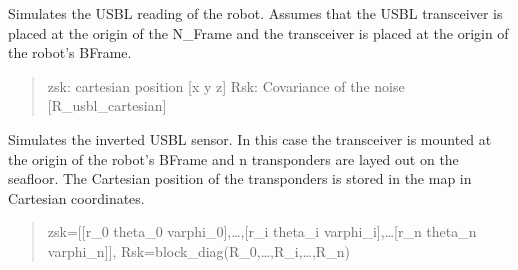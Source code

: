 \documentclass[letterpaper,10pt,english]{sphinxmanual}
\begin{document}
\begin{fulllineitems}
\begin{fulllineitems}
\begin{quote}
\begin{description}
\end{description}\end{quote}

\end{fulllineitems}


\begin{fulllineitems}
\label{\detokenize{robot_simulation:AUV4DOFSimulatedRobot.AUV4DOFSimulatedRobot.ReadUSBL}}
\pysigstartsignatures
{}
\pysigstopsignatures
\sphinxAtStartPar
Simulates the USBL reading of the robot. Assumes that the USBL transceiver is placed at the origin of the
N\_Frame and the transceiver is placed at the origin of the robot’s B\sphinxhyphen{}Frame.
\begin{quote}\begin{description}
\sphinxAtStartPar
zsk: cartesian position {[}x y z{]}
Rsk: Covariance of the noise {[}R\_usbl\_cartesian{]}

\end{description}\end{quote}

\end{fulllineitems}


\begin{fulllineitems}
\label{\detokenize{robot_simulation:AUV4DOFSimulatedRobot.AUV4DOFSimulatedRobot.ReadSpherical3DFeature}}
\pysigstartsignatures
{}
\pysigstopsignatures
\sphinxAtStartPar
Simulates the inverted USBL sensor. In this case the transceiver is mounted at the origin of the robot’s B\sphinxhyphen{}Frame
and n transponders are layed out on the seafloor. The Cartesian position of the transponders is stored in the map
in Cartesian coordinates.
\begin{quote}\begin{description}
\sphinxAtStartPar
zsk={[}{[}r\_0 theta\_0 varphi\_0{]},…,{[}r\_i theta\_i varphi\_i{]},…{[}r\_n theta\_n varphi\_n{]}{]},
Rsk=block\_diag(R\_0,…,R\_i,…,R\_n)


\end{description}
\end{quote}
\end{fulllineitems}
\end{fulllineitems}
\end{document}
